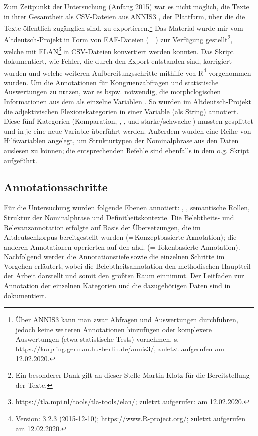 Zum Zeitpunkt der Untersuchung (Anfang 2015) war es nicht möglich, die Texte in ihrer Gesamtheit als CSV-Dateien aus ANNIS3 \parencite{Krause2016}, der Plattform, über die die Texte öffentlich zugänglich sind, zu exportieren.\footnote{Über ANNIS3 kann man zwar Abfragen und Auswertungen durchführen, jedoch keine weiteren Annotationen  hinzufügen oder komplexere Auswertungen (etwa statistische Tests) vornehmen, s. \url{https://korpling.german.hu-berlin.de/annis3/}; zuletzt aufgerufen am 12.02.2020.} Das Material wurde mir vom Altdeutsch-Projekt in Form von EAF-Dateien (=\,) zur Verfügung gestellt\footnote{Ein besonderer Dank gilt an dieser Stelle Martin Klotz für die Bereitstellung der Texte.}, welche mit ELAN\footnote{\url{https://tla.mpi.nl/tools/tla-tools/elan/}; zuletzt aufgerufen: am 12.02.2020.} in CSV-Dateien konvertiert werden konnten. 
Das Skript  \parencite{HZKYL4_2020} dokumentiert, wie Fehler, die durch den Export entstanden sind, korrigiert wurden und welche weiteren Aufbereitungsschritte mithilfe von R\footnote{Version: 3.2.3 (2015-12-10); \url{https://www.R-project.org/}; zuletzt aufgerufen am 12.02.2020.} vorgenommen wurden. 
Um die Annotationen  für Kongruenzabfragen und statistische Auswertungen zu nutzen, war es bspw. notwendig, die morphologischen Informationen aus dem  als einzelne Variablen . So wurden im Altdeutsch-Projekt die adjektivischen  Flexionskategorien in einer Variable (als String)  annotiert. Diese fünf Kategorien (Komparation, , ,  und starke/schwache ) mussten gesplittet und in je eine neue Variable überführt werden. Außerdem wurden eine Reihe von Hilfsvariablen angelegt, um Strukturtypen  der Nominalphrase  aus den Daten auslesen zu können; die entsprechenden Befehle sind ebenfalls in dem o.g. Skript aufgeführt.  

\subsection{Annotationsschritte}\label{sec:annotationsschritte}

Für die Untersuchung wurden folgende Ebenen  annotiert: , ,  semantische Rollen, Struktur der Nominalphrase und Definitheitskontexte. Die  Belebtheits- und Relevanzannotation erfolgte auf Basis der Übersetzungen, die im Altdeutschkorpus  bereitgestellt wurden (=\,Konzeptbasierte Annotation); die anderen Annotationen  operierten auf den ahd.   (=\,Tokenbasierte Annotation). Nachfolgend werden die Annotationstiefe  sowie die einzelnen Schritte im Vorgehen erläutert, wobei die Belebtheitsannotation den methodischen Hauptteil der Arbeit darstellt und somit den größten Raum einnimmt. Der Leitfaden zur Annotation  der einzelnen Kategorien und die dazugehörigen Daten sind in \textcite{HZKYL4_2020} dokumentiert. 

